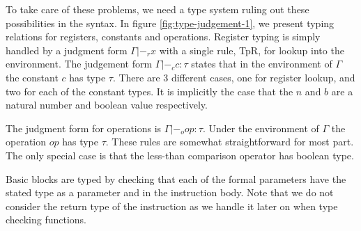 \documentclass[a4paper, oneside, 10pt, draft]{memoir}
\begin{document}
\newcommand{\tpr}{|-_{r}}
\newcommand{\tpc}{|-_{c}}
\newcommand{\tpop}{|-_{o}}
\newcommand{\tpb}{|-_{b}}

To take care of these problems, we need a type system ruling out these
possibilities in the syntax. In figure \ref{fig:type-judgement-1}, we
present typing relations for registers, constants and
operations. Register typing is simply handled by a judgment form
$\boxed{\Gamma \tpr x}$ with a single rule, TpR, for lookup into the
environment. The judgement form $\boxed{\Gamma \tpc c : \tau}$ states
that in the environment of $\Gamma$ the constant $c$ has type
$\tau$. There are 3 different cases, one for register lookup, and two
for each of the constant types. It is implicitly the case that the $n$
and $b$ are a natural number and boolean value respectively.

The judgment form for operations is $\boxed{\Gamma \tpop op :
  \tau}$. Under the environment of $\Gamma$ the operation $op$ has
type $\tau$. These rules are somewhat straightforward for most
part. The only special case is that the less-than comparison operator
has boolean type.

Basic blocks are typed by checking that each of the formal parameters
have the stated type as a parameter and in the instruction body. Note
that we do not consider the return type of the instruction as we
handle it later on when type checking functions.
\end{document}

